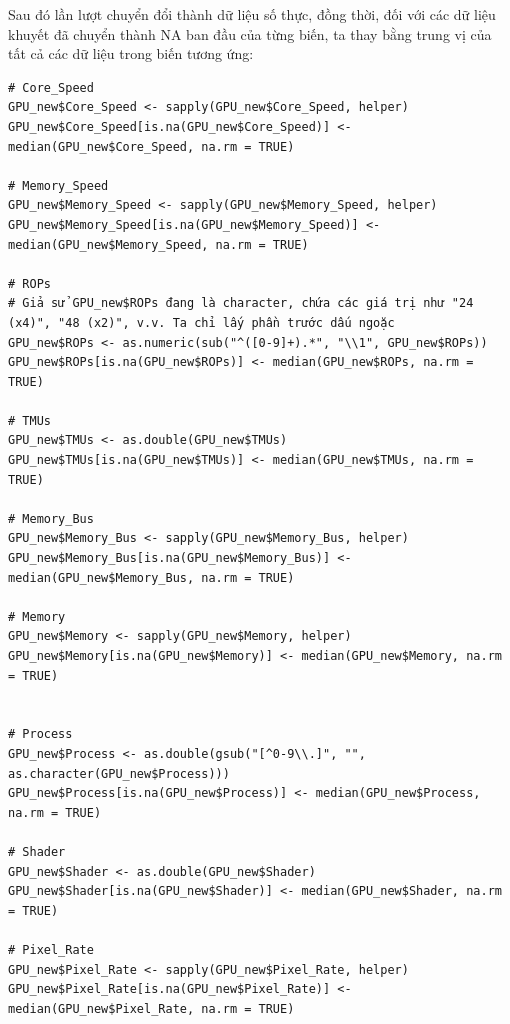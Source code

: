 Sau đó lần lượt chuyển đổi thành dữ liệu số thực, đồng thời, đối với các dữ liệu khuyết đã chuyển thành NA ban đầu của từng biến, ta thay bằng trung vị của tất cả các dữ liệu trong biến tương ứng:
\begin{verbatim}   
# Core_Speed
GPU_new$Core_Speed <- sapply(GPU_new$Core_Speed, helper)
GPU_new$Core_Speed[is.na(GPU_new$Core_Speed)] <- median(GPU_new$Core_Speed, na.rm = TRUE)

# Memory_Speed
GPU_new$Memory_Speed <- sapply(GPU_new$Memory_Speed, helper)
GPU_new$Memory_Speed[is.na(GPU_new$Memory_Speed)] <- median(GPU_new$Memory_Speed, na.rm = TRUE)

# ROPs
# Giả sử GPU_new$ROPs đang là character, chứa các giá trị như "24 (x4)", "48 (x2)", v.v. Ta chỉ lấy phần trước dấu ngoặc
GPU_new$ROPs <- as.numeric(sub("^([0-9]+).*", "\\1", GPU_new$ROPs))
GPU_new$ROPs[is.na(GPU_new$ROPs)] <- median(GPU_new$ROPs, na.rm = TRUE)

# TMUs
GPU_new$TMUs <- as.double(GPU_new$TMUs)
GPU_new$TMUs[is.na(GPU_new$TMUs)] <- median(GPU_new$TMUs, na.rm = 
TRUE)

# Memory_Bus
GPU_new$Memory_Bus <- sapply(GPU_new$Memory_Bus, helper)
GPU_new$Memory_Bus[is.na(GPU_new$Memory_Bus)] <- median(GPU_new$Memory_Bus, na.rm = TRUE)

# Memory
GPU_new$Memory <- sapply(GPU_new$Memory, helper)
GPU_new$Memory[is.na(GPU_new$Memory)] <- median(GPU_new$Memory, na.rm = TRUE)


# Process
GPU_new$Process <- as.double(gsub("[^0-9\\.]", "", as.character(GPU_new$Process)))
GPU_new$Process[is.na(GPU_new$Process)] <- median(GPU_new$Process, na.rm = TRUE)

# Shader
GPU_new$Shader <- as.double(GPU_new$Shader)
GPU_new$Shader[is.na(GPU_new$Shader)] <- median(GPU_new$Shader, na.rm = TRUE)

# Pixel_Rate 
GPU_new$Pixel_Rate <- sapply(GPU_new$Pixel_Rate, helper) 
GPU_new$Pixel_Rate[is.na(GPU_new$Pixel_Rate)] <- median(GPU_new$Pixel_Rate, na.rm = TRUE)
\end{verbatim}

